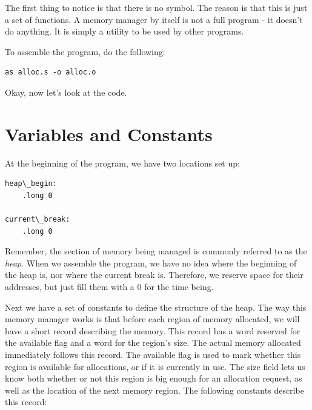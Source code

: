 \begin{simpletyping}

\end{simpletyping}

The first thing to notice is that there is no  symbol.  The reason
is that this is just a set of functions.  A memory manager by itself is not a full 
program - it doesn't do anything.  It is simply a utility to be used by other programs.

To assemble the program, do the following:

\begin{simpletyping}
\begin{lstlisting}
as alloc.s -o alloc.o
\end{lstlisting}
\end{simpletyping}

Okay, now let's look at the code.

\section{Variables and Constants}

At the beginning of the program, we have two locations set up:

\begin{simpletyping}
\begin{lstlisting}
heap\_begin:
	.long 0

current\_break:
	.long 0
\end{lstlisting}
\end{simpletyping}

Remember, the section of memory being managed is commonly referred to as
the \emph{heap}. 
When we assemble the program, we have no idea where the beginning of the heap is, nor 
where the current break 
is.  Therefore, we reserve space for their addresses, but just fill them with a 0 for the
time being.  

Next we have a set of constants to define the structure of the heap.  The way this
memory manager works is that before each region of memory allocated, we will have a 
short record describing the memory.
This record has a word reserved for the available flag and a word for the region's size.
The actual memory allocated immediately follows this record.  The available flag is used
to mark whether this region is available for allocations, or if it is currently in
use.  The size field lets us know both whether or not this region is big enough for
an allocation request, as well as the location of the next memory region.
The following constants describe this record:

